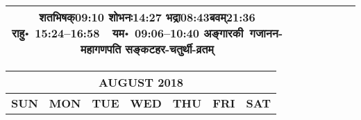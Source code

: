 \documentclass[a3paper,12pt,landscape]{article}
\newcommand{\To}{\hspace{1pt}\raisebox{0pt}{\tiny\RIGHTarrow}\hspace{1pt}}
\newcommand{\rahuyama}[2]{%
{राहु॰~\textsf{#1}~~यम॰~\textsf{#2}}
}
\begin{document}
\begin{center}
\begin{tabular}{|c|c|c|c|c|c|c|}
{{\mbox{शतभिषक्\To{}\textsf{09:10\hspace{2ex}}}}%
{\mbox{शोभनः\To{}\textsf{14:27\hspace{2ex}}}}%
{\mbox{भद्रा\To{}\textsf{08:43\hspace{2ex}}}\mbox{बवम्\To{}\textsf{21:36\hspace{2ex}}}}}%
{\rahuyama{15:24--16:58}{09:06--10:40}}%
{अङ्गारकी~गजानन-महागणपति सङ्कटहर-चतुर्थी-व्रतम्}
&
\mbox{}  & %
\mbox{}  & %
\mbox{}  & %
\\ \hline
\end{tabular}



\begin{tabular}{|c|c|c|c|c|c|c|}
\multicolumn{7}{c}{\Large \bfseries \sffamily AUGUST 2018}\\[3mm]
\hline
\textbf{\textsf{SUN}} & \textbf{\textsf{MON}} & \textbf{\textsf{TUE}} & \textbf{\textsf{WED}} & \textbf{\textsf{THU}} & \textbf{\textsf{FRI}} & \textbf{\textsf{SAT}} \\ \hline


\end{tabular}
\end{center}
\end{document}
